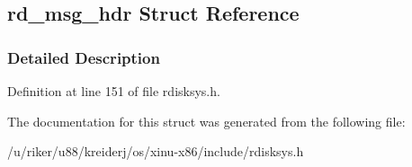 \hypertarget{structrd__msg__hdr}{}\subsection{rd\+\_\+msg\+\_\+hdr Struct Reference}
\label{structrd__msg__hdr}


\subsubsection{Detailed Description}


Definition at line 151 of file rdisksys.\+h.



The documentation for this struct was generated from the following file\+:\begin{DoxyCompactItemize}
\item 
/u/riker/u88/kreiderj/os/xinu-\/x86/include/rdisksys.\+h\end{DoxyCompactItemize}
